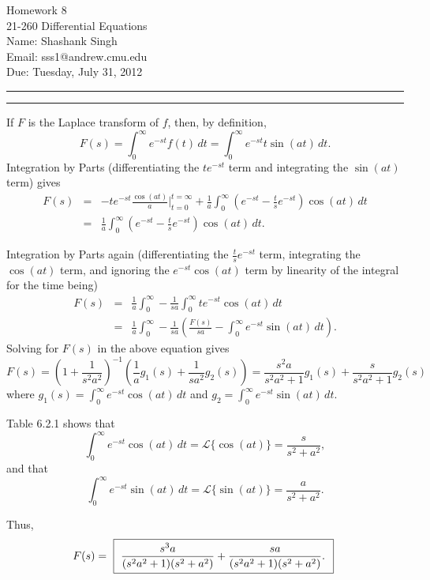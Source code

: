 \documentclass[11pt]{article}
\makeatletter
\newcounter{questionCounter}
\newcounter{partCounter}[questionCounter]
\newenvironment{question}[2][\arabic{questionCounter}]{%
    \setcounter{partCounter}{0}%
    \vspace{.25in} \hrule \vspace{0.5em}%
        \noindent{\bf #2}%
    \vspace{0.8em} \hrule \vspace{.10in}%
    \addtocounter{questionCounter}{1}%
}{}
\newcommand{\myname}{Shashank Singh}
\newcommand{\myandrew}{sss1@andrew.cmu.edu}
\newcommand{\myclass}{21-260 Differential Equations}
\newcommand{\myhwnum}{8}
\newcommand{\duedate}{Tuesday, July 31, 2012}
\newcommand{\inv}{^{-1}}
\makeatother
\begin{document}
\thispagestyle{plain}

{\Large Homework \myhwnum} \\
\myclass \\
Name: \myname \\
Email: \myandrew \\
Due: \duedate \\
\begin{question}{Section 6.1, Problem 16}
If $F$ is the Laplace transform of $f$, then, by definition,
\[F(s)
 = \int_0^{\infty} e^{-st} f(t) \, dt
 = \int_0^{\infty} e^{-st} t \sin(at) \, dt.
\]
Integration by Parts (differentiating the $te^{-st}$ term and integrating the
$\sin(at)$ term) gives
\begin{eqnarray*}
F(s)
 & = & -te^{-st}\frac{\cos(at)}{a}\big|_{t = 0}^{t = \infty}
   + \frac1a\int_0^{\infty}\left(e^{-st}
                                  - \frac{t}{s}e^{-st}\right)\cos(at) \, dt \\
 & = & \frac1a\int_0^{\infty}\left(e^{-st}
                                  - \frac{t}{s}e^{-st}\right)\cos(at) \, dt.
\end{eqnarray*}

Integration by Parts again (differentiating the $\frac{t}{s}e^{-st}$ term,
integrating the $\cos(at)$ term, and ignoring the $e^{-st}\cos(at)$ term by
linearity of the integral for the time being)
\begin{eqnarray*}
F(s)
 & = & \frac1a\int_0^{\infty}
                        - \frac{1}{sa}\int_0^{\infty}te^{-st}\cos(at) \, dt \\
 & = & \frac1a\int_0^{\infty}
                - \frac{1}{sa}\left( \frac{F(s)}{sa}
                                 - \int_0^{\infty}e^{-st}\sin(at) \, dt\right).
\end{eqnarray*}
Solving for $F(s)$ in the above equation gives
\[F(s)
 = \left(1 + \frac{1}{s^2a^2}\right)\inv
   \left(\frac1a g_1(s) + \frac{1}{sa^2}g_2(s)\right)
 = \frac{s^2a}{s^2a^2 + 1}g_1(s) + \frac{s}{s^2a^2 + 1}g_2(s)
\]
where $g_1(s) = \int_0^{\infty} e^{-st}\cos(at) \, dt$ and
$g_2 = \int_0^{\infty} e^{-st} \sin(at) \, dt$.

Table 6.2.1 shows that
\[\int_0^{\infty}e^{-st}\cos(at) \, dt
 = \mathcal{L}\{\cos(at)\} = \frac{s}{s^2 + a^2},\]
and that
\[\int_0^{\infty}e^{-st}\sin(at) \, dt
 = \mathcal{L}\{\sin(at)\} = \frac{a}{s^2 + a^2}.\]

Thus,
\[F(s)
 = \mbox{
    \fbox{
        $\displaystyle
            \frac{s^3a}{(s^2a^2 + 1)(s^2 + a^2)} + \frac{sa}{(s^2a^2 + 1)(s^2 + a^2)}
        $.
    }
   }
\]
\end{question}
\end{document}
